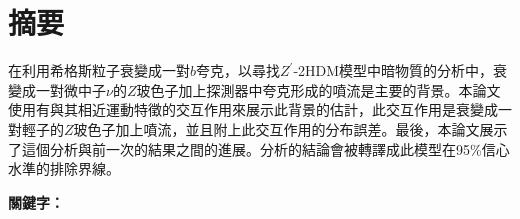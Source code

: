 \documentclass[class=NTHU_thesis, crop=false]{standalone}
\begin{document}
\setlength{\parindent}{2em} %

\chapter{摘要}
在利用希格斯粒子衰變成一對$b$夸克，以尋找$Z^\prime$-2HDM模型中暗物質的分析中，衰變成一對微中子$\nu$的$Z$玻色子加上探測器中夸克形成的噴流是主要的背景。本論文使用有與其相近運動特徵的交互作用來展示此背景的估計，此交互作用是衰變成一對輕子的$Z$玻色子加上噴流，並且附上此交互作用的分布誤差。最後，本論文展示了這個分析與前一次的結果之間的進展。分析的結論會被轉譯成此模型在95\%信心水準的排除界線。

\vspace{2em}
\noindent \textbf{關鍵字：} \keywordsZh{} %
\end{document}
